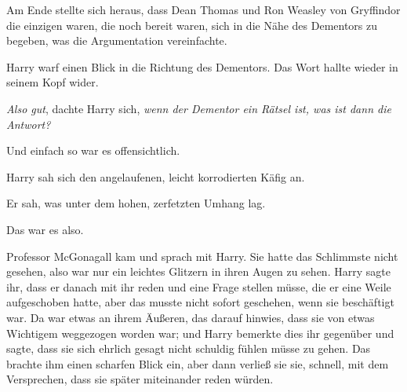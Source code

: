Am Ende stellte sich heraus, dass Dean Thomas und Ron Weasley von Gryffindor die einzigen waren, die noch bereit waren, sich in die Nähe des Dementors zu begeben, was die Argumentation vereinfachte.

Harry warf einen Blick in die Richtung des Dementors. Das Wort hallte wieder in seinem Kopf wider.

\emph{Also gut}, dachte Harry sich, \emph{wenn der Dementor ein Rätsel ist, was ist dann die Antwort?}

Und einfach so war es offensichtlich.

Harry sah sich den angelaufenen, leicht korrodierten Käfig an.

Er sah, was unter dem hohen, zerfetzten Umhang lag.

Das war es also.

Professor McGonagall kam und sprach mit Harry. Sie hatte das Schlimmste nicht gesehen, also war nur ein leichtes Glitzern in ihren Augen zu sehen. Harry sagte ihr, dass er danach mit ihr reden und eine Frage stellen müsse, die er eine Weile aufgeschoben hatte, aber das musste nicht sofort geschehen, wenn sie beschäftigt war. Da war etwas an ihrem Äußeren, das darauf hinwies, dass sie von etwas Wichtigem weggezogen worden war; und Harry bemerkte dies ihr gegenüber und sagte, dass sie sich ehrlich gesagt nicht schuldig fühlen müsse zu gehen. Das brachte ihm einen scharfen Blick ein, aber dann verließ sie sie, schnell, mit dem Versprechen, dass sie später miteinander reden würden.

